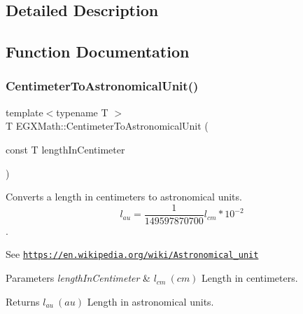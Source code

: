 \subsection{Detailed Description}


\subsection{Function Documentation}
\mbox{\label{group___e_g_x_math-_conversions-_length_conversions-_centimeter-_astronomical_gaa8152adbb5be9ad80f2495646bbf316d}} 
\subsubsection{\texorpdfstring{Centimeter\+To\+Astronomical\+Unit()}{CentimeterToAstronomicalUnit()}}
{\footnotesize\ttfamily template$<$typename T $>$ \\
T E\+G\+X\+Math\+::\+Centimeter\+To\+Astronomical\+Unit (\begin{DoxyParamCaption}\item[{const T}]{length\+In\+Centimeter }\end{DoxyParamCaption})}



Converts a length in centimeters to astronomical units. \[ l_{au}= \frac{1}{149597870700} l_{cm} * 10^{-2} \]. 

See \href{https://en.wikipedia.org/wiki/Astronomical_unit}{\tt https\+://en.\+wikipedia.\+org/wiki/\+Astronomical\+\_\+unit} 
\begin{DoxyParams}{Parameters}
{\em length\+In\+Centimeter} & $ l_{cm}\ (cm)$ Length in centimeters. \\
\hline
\end{DoxyParams}
\begin{DoxyReturn}{Returns}
$ l_{au}\ (au)$ Length in astronomical units. 
\end{DoxyReturn}
\mbox{\label{group___e_g_x_math-_conversions-_length_conversions-_centimeter-_astronomical_ga99b5eb487ffbb3d89497999b562ea77e}} 
